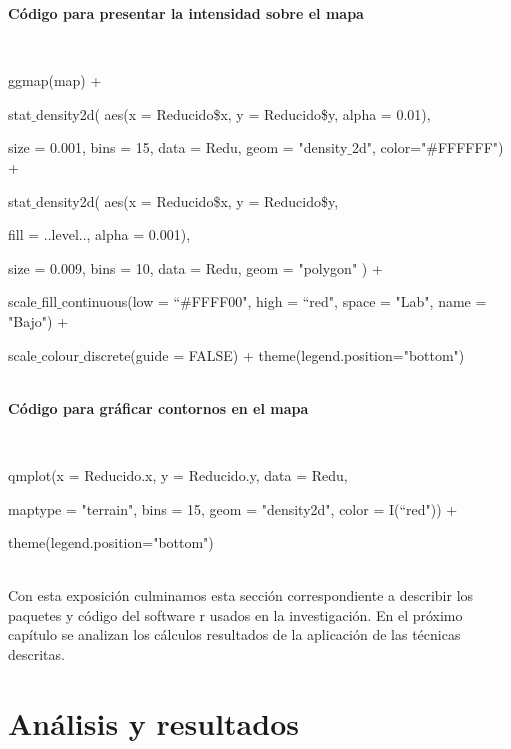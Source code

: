 \documentclass[12pt]{report}
\begin{document}
{{{{{{{{{{{{			            
			 
			  		
			\textbf{Código para presentar la intensidad sobre el mapa}{\label{M-codigo}\\			 				
				
				{ \scriptsize  { \ttfamily            
			 
			 
			 
			 ggmap(map) +  
			 
			 stat$\_$density2d( aes(x = Reducido\$x, y = Reducido\$y,  alpha = 0.01),
			 
			 size = 0.001, bins = 15, data = Redu, geom = "density$\_$2d", color="\#FFFFFF") + 
			 
			 stat$\_$density2d( aes(x = Reducido\$x, y = Reducido\$y,
			  
			 fill = ..level.., alpha = 0.001),
			 
			 size = 0.009, bins = 10, data = Redu, geom = "polygon" ) +
			 
			 scale$\_$fill$\_$continuous(low = “\#FFFF00", high =  “red", space = "Lab", name = "Bajo")  + \vspace{-0.15cm}
			 
			 scale$\_$colour$\_$discrete(guide = FALSE) +  theme(legend.position="bottom")   }} \\
			            
			 	\textbf{Código para  gráficar contornos en el mapa}{\label{M-codigo}\\			 				
			 	
			 	{ \scriptsize  { \ttfamily   	
		
	    	qmplot(x = Reducido.x, y = Reducido.y, data = Redu,	
	    	
	    	maptype = "terrain", bins = 15,   geom = "density2d", color = I(“red")) + \vspace{-0.15cm}
	    	
	    	
		       theme(legend.position="bottom")     }}	\\ 			
			 	
			 				
			
	

Con esta exposición culminamos esta sección correspondiente a describir los paquetes y código del software r usados en la investigación. En el próximo capítulo  se analizan los cálculos resultados de la aplicación de las técnicas descritas.  
             
				
  \chapter{Análisis y resultados}
				
}}}}}}}}}}}}}}
\end{document}
